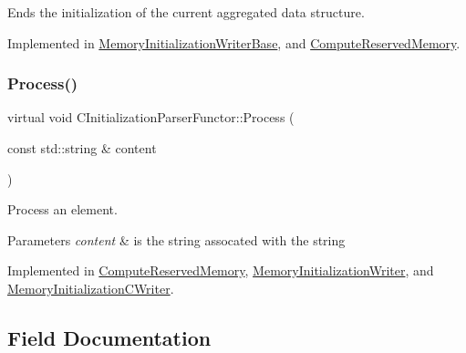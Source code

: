 Ends the initialization of the current aggregated data structure. 



Implemented in \hyperlink{classMemoryInitializationWriterBase_a0ff1c989969769e131c36172cc3f8ce3}{Memory\+Initialization\+Writer\+Base}, and \hyperlink{classComputeReservedMemory_acce81c68136abf8d4f6db310947454bf}{Compute\+Reserved\+Memory}.

\mbox{\label{classCInitializationParserFunctor_ac84560143f5dcbb961ba1a8f43fea9a1}} 
\subsubsection{\texorpdfstring{Process()}{Process()}}
{\footnotesize\ttfamily virtual void C\+Initialization\+Parser\+Functor\+::\+Process (\begin{DoxyParamCaption}\item[{const std\+::string \&}]{content }\end{DoxyParamCaption})\hspace{0.3cm}{\ttfamily [pure virtual]}}



Process an element. 


\begin{DoxyParams}{Parameters}
{\em content} & is the string assocated with the string \\
\hline
\end{DoxyParams}


Implemented in \hyperlink{classComputeReservedMemory_a2cb9e87cd6acac14021dede18b50f54b}{Compute\+Reserved\+Memory}, \hyperlink{classMemoryInitializationWriter_a7a4a0905d7608fefb20b426df5a845aa}{Memory\+Initialization\+Writer}, and \hyperlink{classMemoryInitializationCWriter_a9f35397c3df92849e7f235b5da9c7bb0}{Memory\+Initialization\+C\+Writer}.



\subsection{Field Documentation}
\mbox{\label{classCInitializationParserFunctor_ac8a4c644de72a75e2ab5b0ed3403bfc5}} 
